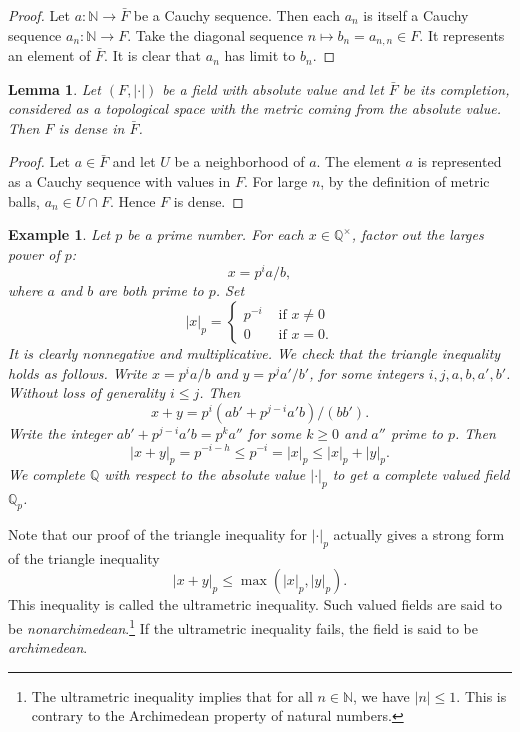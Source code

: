 \documentclass{amsart}
\newcommand{\ring}[1]{\mathbb{#1}}
\newtheorem{lemma}[equation]{Lemma}
\newtheorem{example}[exercise]{Example}
\def\newterm#1{{\it #1}}
\def\abs#1{{|#1|}}
\begin{document}
\begin{proof} Let $a:\ring{N}\to \bar F$ be a Cauchy sequence.
Then each $a_n$ is itself a Cauchy sequence $a_n:\ring{N}\to F$.
Take the diagonal sequence $n\mapsto b_n = a_{n,n}\in F$.  It represents an
element of $\bar F$.  It is clear that $a_n$ has limit
to $b_n$.
\end{proof}


\begin{lemma} Let $(F,\abs{\cdot})$ be a field with absolute value and
let $\bar F$ be its completion, considered as a topological space with
the metric coming from the absolute value.  Then $F$ is dense in $\bar F$.
\end{lemma}

\begin{proof} Let $a\in \bar F$ and let $U$ be a neighborhood of $a$.
  The element $a$ is represented as a Cauchy sequence with values in
  $F$.  For large $n$, by the definition of metric balls, $a_n\in
  U\cap F$.  Hence $F$ is dense.
\end{proof}

\begin{example} Let $p$ be a prime number.  For each
  $x\in\ring{Q}^\times$, factor out the larges power of $p$:
\[
x = p^i a/b,
\]
where $a$ and $b$ are both prime to $p$.
Set
\[
\abs{x}_p = \begin{cases} p^{-i}&\text{ if } x\ne 0\\
  0&\text{ if } x = 0.
  \end{cases}
\]
It is clearly nonnegative and multiplicative.  We check that the
triangle inequality holds as follows.  Write $x = p^i a/b$ and $y =
p^j a'/b'$, for some integers $i,j,a,b,a',b'$.  Without loss of
generality $i\le j$.  Then
\[
x + y = p^i (a b' + p^{j-i} a' b)/(b b').
\]
Write the integer $a b' + p^{j-i} a' b = p^k a''$ for some $k\ge 0$
and $a''$ prime to $p$.  Then
\[
\abs{x+y}_p = p^{-i-h} \le p^{-i} = \abs{x}_p \le \abs{x}_p + \abs{y}_p.
\]
We complete $\ring{Q}$ with respect to the absolute value
$\abs{\cdot}_p$ to get a complete valued field $\ring{Q}_p$.
\end{example}

Note that our proof of the triangle inequality for $\abs{\cdot}_p$ actually
gives a strong form of the triangle inequality
\begin{equation}
\abs{x+y}_p \le \max(\abs{x}_p,\abs{y}_p).
\end{equation}
This inequality is called the ultrametric inequality.  Such valued fields
are said to be \newterm{nonarchimedean}.\footnote{The ultrametric inequality
implies that for all $n\in\ring{N}$, we have $\abs{n}\le 1$.  This is
contrary to the Archimedean property of natural numbers.}  
If the ultrametric inequality fails,
the field is said to be \newterm{archimedean}.
\end{document}
